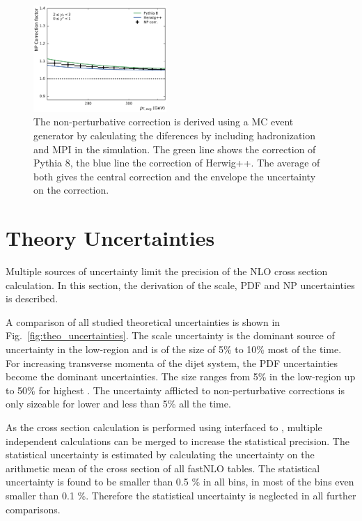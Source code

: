 \begin{figure}[htp]
    \includegraphics[width=0.45\textwidth]{figures/theory/np_factors_calc_yb2ys0.pdf}
    \caption{The non-perturbative correction is derived using a MC event
        generator by calculating the diferences by including hadronization and
        MPI in the simulation. The green line shows the correction of Pythia 8,
        the blue line the correction of Herwig++. The average of both gives the
        central correction and the envelope the uncertainty on the correction.}
    \label{fig:np_factors}
\end{figure}

\section{Theory Uncertainties}

Multiple sources of uncertainty limit the precision of the NLO cross section
calculation. In this section, the derivation of the scale, PDF and NP
uncertainties is described. 

A comparison of all studied theoretical uncertainties is shown in
Fig.~\ref{fig:theo_uncertainties}. The scale uncertainty is the dominant source
of uncertainty in the low-\pt region and is of the size of 5\% to 10\% most of
the time. For increasing transverse momenta of the dijet system, the PDF
uncertainties become the dominant uncertainties. The size ranges from 5\% in the
low-\pt region up to 50\% for highest \pt. The uncertainty afflicted to
non-perturbative corrections is only sizeable for lower \pt and less than 5\%
all the time.

As the cross section calculation is performed using \fastNLO interfaced to
\NLOJETPP, multiple independent calculations can be merged to increase the
statistical precision. The statistical uncertainty is estimated by calculating
the uncertainty on the arithmetic mean of the cross section of all fastNLO
tables.  The statistical uncertainty is found to be smaller than 0.5 \% in all
bins, in most of the bins even smaller than 0.1 \%. Therefore the statistical
uncertainty is neglected in all further comparisons.

